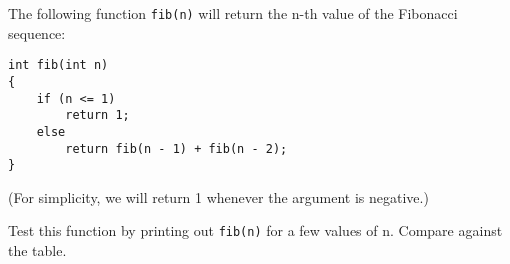 The following function \verb!fib(n)! will return the n-th value of the Fibonacci sequence:


\begin{Verbatim}[frame=single]
int fib(int n)
{
    if (n <= 1)
        return 1;
    else
        return fib(n - 1) + fib(n - 2);
}
\end{Verbatim}

(For simplicity, we will return 1 whenever the argument is negative.)

Test this function by printing out \verb!fib(n)! for a few values of n.
Compare against the table.

